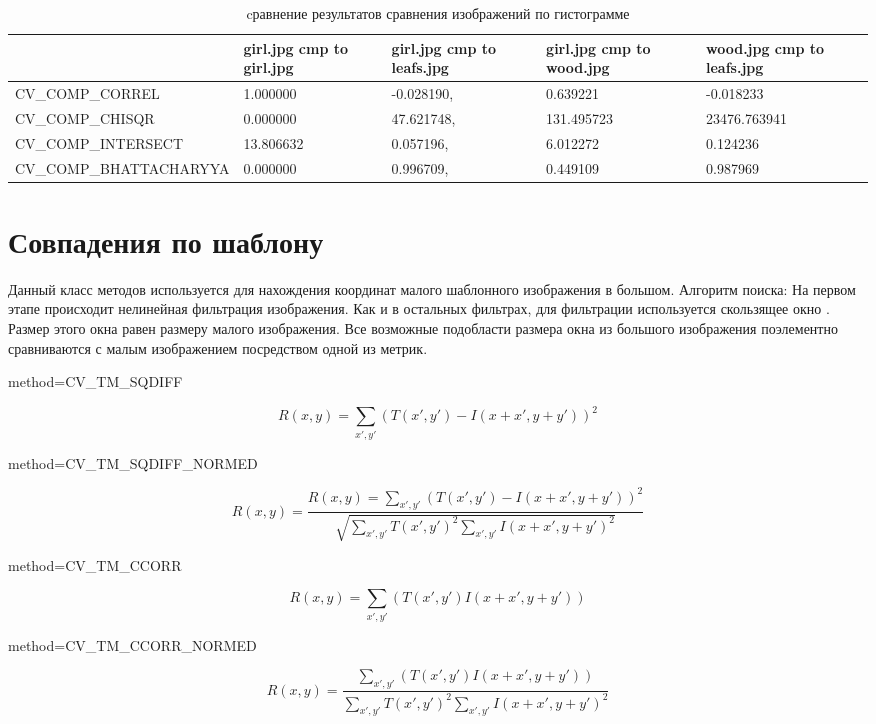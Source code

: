 \documentclass[oneside,final,14pt]{extreport}
\begin{document}
\begin{table}[H] 
\caption{cравнение результатов сравнения изображений по гистограмме}
\begin{tabularx}{\textwidth}{|X|X|X|X|X|}
\hline
 & 
girl.jpg cmp to girl.jpg
&
girl.jpg cmp to leafs.jpg
&
girl.jpg cmp to wood.jpg
&
wood.jpg cmp to leafs.jpg
\\
\hline
CV\_\allowbreak COMP\_\allowbreak CORREL
&
 1.000000
& 
 -0.028190, 
&
0.639221
&
-0.018233
\\
\hline
CV\_\allowbreak COMP\_\allowbreak CHISQR
&
0.000000
&
 47.621748, 
&
131.495723
&
23476.763941
\\
\hline
CV\_\allowbreak COMP\_\allowbreak INTERSECT
&
13.806632
&
0.057196, 
&
6.012272
&
 0.124236
\\
\hline
CV\_\allowbreak COMP\_\allowbreak BHATTA\allowbreak CHARYYA
&
 0.000000
&
0.996709, 
&
0.449109
&
0.987969
\\
\hline
\end{tabularx}
\end{table}

\section{Совпадения по шаблону}
Данный класс методов используется для нахождения координат малого шаблонного изображения в большом. Алгоритм поиска:
На первом этапе происходит нелинейная фильтрация изображения. Как и в остальных фильтрах, для фильтрации используется скользящее окно \cite{Dup:cousache}. Размер этого окна равен размеру малого изображения. Все возможные подобласти размера окна  из большого изображения поэлементно сравниваются с малым изображением посредством одной из метрик.   

 method=CV\_TM\_SQDIFF

$$
R(x,y)
=
\sum_{x',y'}
(T(x',y')-I(x+x',y+y'))^2
$$ 

method=CV\_TM\_SQDIFF\_NORMED

$$
R(x,y)
=
\frac{
R(x,y)
=
\sum_{x',y'}
(T(x',y')-I(x+x',y+y'))^2
}
{
\sqrt{
	\sum_{x',y'}
	T(x',y')^2
	\sum_{x',y'}
	I(x+x',y+y')^2
	}
}
$$

method=CV\_TM\_CCORR

$$
R(x,y)
=
\sum_{x',y'}
( T(x',y')I(x+x',y+y'))
$$

method=CV\_TM\_CCORR\_NORMED

$$
R(x,y)
=
\frac{
	\sum_{x',y'}
	( T(x',y')I(x+x',y+y'))
}
{
	\sum_{x',y'}
	T(x',y')^2
	\sum_{x',y'}
	I(x+x',y+y')^2
}
$$
\end{document}
